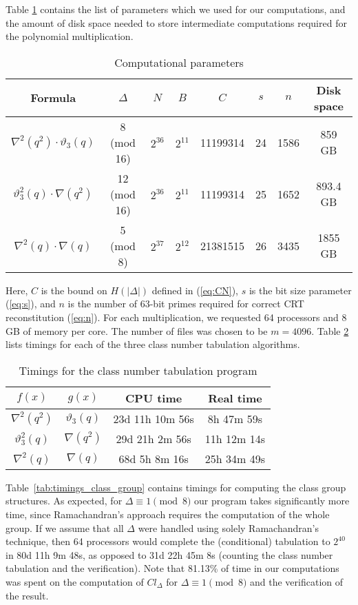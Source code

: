 \documentclass{mcom-l}
\theoremstyle{definition}
\begin{document}
Table \ref{tab:parameters} contains the list of parameters which we
used for our computations, and the amount of disk space needed to
store intermediate computations required for the polynomial
multiplication.
\begin{table}[htb]
\centering
\caption{Computational parameters}
\label{tab:parameters}
\begin{tabular}{| c | c || c | c | c | c | c | c |}
\hline
Formula & $\Delta$ & $N$ & $B$ & $C$ & $s$ & $n$ & Disk space\\
\hline
\hline
$\nabla^2(q^2)\cdot \vartheta_3(q)$ & 8 (mod 16) & $2^{36}$ & $2^{11}$ & 11199314 & 24 & 1586 & 859 GB\\
\hline
$\vartheta_3^2(q) \cdot \nabla(q^2)$ & 12 (mod 16) & $2^{36}$ & $2^{11}$ & 11199314 & 25 & 1652 & 893.4 GB\\
\hline
$\nabla^2(q) \cdot \nabla(q)$ & 5 (mod 8) & $2^{37}$ & $2^{12}$ & 21381515 & 26 & 3435 & 1855 GB\\
\hline
\end{tabular}
\end{table}
Here, $C$ is the bound on $H(|\Delta|)$ defined in (\ref{eq:CN}), $s$
is the bit size parameter (\ref{eq:s}), and $n$ is the number of
63-bit primes required for correct CRT reconstitution
(\ref{eq:n}). For each multiplication, we requested 64 processors and
8 GB of memory per core. The number of files was chosen to be $m =
4096$.  Table \ref{tab:clnum_timings} lists timings for each of the
three class number tabulation algorithms.
\begin{table}[htb]
\centering
\small
\caption{Timings for the class number tabulation program}
\label{tab:clnum_timings}
\begin{tabular}{| c | c || c | c |}
\hline
$f(x)$ & $g(x)$ & CPU time & Real time\\
\hline
\hline
$\nabla^2(q^2)$ & $\vartheta_3(q)$ & 23d 11h 10m 56s & 8h 47m 59s\\
\hline
$\vartheta_3^2(q)$ & $\nabla(q^2)$ & 29d 21h 2m 56s & 11h 12m 14s\\
\hline
$\nabla^2(q)$ & $\nabla(q)$ & 68d 5h 8m 16s & 25h 34m 49s\\
\hline
\end{tabular}
\end{table}

Table~\ref{tab:timings_class_group} contains timings for computing the
class group structures.
As expected, for $\Delta \equiv 1 \pmod{8}$ our program takes
significantly more time, since Ramachandran's approach requires the
computation of the whole group. If we assume that all $\Delta$ were
handled using solely Ramachandran's technique, then 64 processors
would complete the (conditional) tabulation to $2^{40}$ in 80d 11h 9m
48s, as opposed to 31d 22h 45m 8s (counting the class number
tabulation and the verification). Note that 81.13\% of time in our
computations was spent on the computation of $Cl_\Delta$ for $\Delta
\equiv 1 \pmod{8}$ and the verification of the result.
\end{document}
